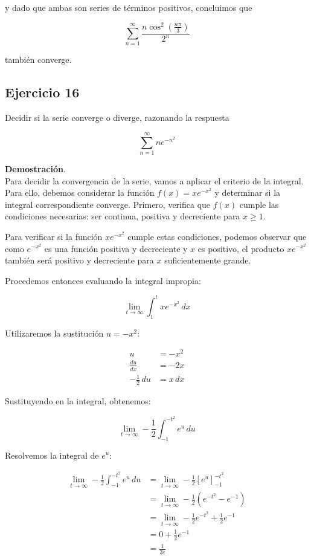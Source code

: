 \documentclass{article}
\begin{document}
    y dado que ambas son series de términos positivos, concluimos que

    $$
    \sum_{n=1}^{\infty} \frac{n \cos ^{2}\left(\frac{n \pi}{3}\right)}{2^{n}}
    $$

    también converge.

    \subsection*{Ejercicio 16}

    Decidir si la serie converge o diverge, razonando la respuesta

    $$
    \sum_{n=1}^{\infty} n e^{-n^{2}}
    $$

    \textbf{Demostración}.\\

    Para decidir la convergencia de la serie, vamos a aplicar el criterio de la integral. Para ello, debemos considerar la función $f(x) = x e^{-x^{2}}$ y determinar si la integral correspondiente converge. Primero, verifica que $f(x)$ cumple las condiciones necesarias: ser continua, positiva y decreciente para $x \geq 1$.

    Para verificar si la función $x e^{-x^{2}}$ cumple estas condiciones, podemos observar que como $e^{-x^{2}}$ es una función positiva y decreciente y $x$ es positivo, el producto $x e^{-x^{2}}$ también será positivo y decreciente para $x$ suficientemente grande.

    Procedemos entonces evaluando la integral impropia:

    $$
    \lim _{t \rightarrow \infty} \int_{1}^{t} x e^{-x^{2}} \, dx
    $$

    Utilizaremos la sustitución \( u = -x^2 \):

    $$
    \begin{align*}
    u &= -x^{2} \\
    \frac{d u}{d x} &= -2 x \\
    -\frac{1}{2} \, du &= x \, dx
    \end{align*}
    $$

    Sustituyendo en la integral, obtenemos:

    $$
    \lim _{t \rightarrow \infty} -\frac{1}{2} \int_{-1}^{-t^{2}} e^{u} \, du
    $$

    Resolvemos la integral de \( e^u \):

    $$
    \begin{align*}
    \lim _{t \rightarrow \infty} -\frac{1}{2} \int_{-1}^{-t^{2}} e^{u} \, du &= \lim _{t \rightarrow \infty} -\frac{1}{2} \left[ e^{u} \right]_{-1}^{-t^{2}} \\
    &= \lim _{t \rightarrow \infty} -\frac{1}{2} \left( e^{-t^{2}} - e^{-1} \right) \\
    &= \lim _{t \rightarrow \infty} -\frac{1}{2} e^{-t^{2}} + \frac{1}{2} e^{-1} \\
    &= 0 + \frac{1}{2} e^{-1} \\
    &= \frac{1}{2e}
    \end{align*}
    $$
\end{document}
